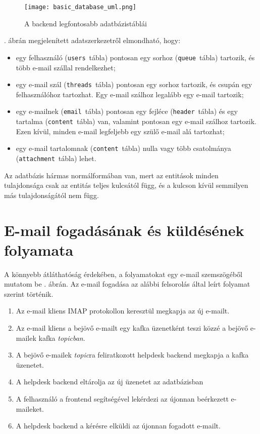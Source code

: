  \begin{figure}[hbt] 
 	\centering
 	\texttt{[image: basic\_database\_uml.png]}
 	\caption{A backend legfontosabb adatbázistáblái}
 	\label{fig:basic_database_uml}
 \end{figure}


. ábrán megjelenített adatszerkezetről elmondható, hogy:
\begin{itemize}
	\item egy felhasználó (\texttt{users}~tábla) pontosan egy sorhoz (\texttt{queue}~tábla) tartozik, és több e-mail szállal rendelkezhet;
	
	\item egy e-mail szál (\texttt{threads}~tábla) pontosan egy sorhoz tartozik, és csupán egy felhasználóhoz tartozhat. Egy e-mail szálhoz legalább egy e-mail tartozik;
	
	\item egy e-mailnek (\texttt{email}~tábla) pontosan egy fejléce (\texttt{header}~tábla) és egy tartalma (\texttt{content}~tábla) van, valamint pontosan egy  e-mail szálhoz tartozik. Ezen kívül, minden e-mail legfeljebb egy szülő e-mail alá tartozhat;

	\item egy e-mail tartalomnak (\texttt{content}~tábla) nulla vagy több csatolmánya (\texttt{attachment}~tábla) lehet.
\end{itemize}

Az adatbázis hármas normálformában van, mert az entitások minden tulajdonsága csak az entitás teljes kulcsától függ, és a kulcson kívül semmilyen más tulajdonságától nem függ.



\section{E-mail fogadásának és küldésének folyamata}
A könnyebb átláthatóság érdekében, a folyamatokat egy e-mail szemszögéből mutatom be . ábrán. Az e-mail fogadása az alábbi felsorolás által leírt folyamat szerint történik.
\begin{enumerate}
	\item Az e-mail kliens IMAP protokollon keresztül megkapja az új e-mailt.
	\item Az e-mail kliens a bejövő e-mailt egy kafka üzenetként teszi közzé a bejövő e-mailek kafka \emph{topicban}.
	\item A bejövő e-mailek \emph{topic}ra feliratkozott helpdesk backend megkapja a kafka üzenetet.
	\item A helpdesk backend eltárolja az új üzenetet az adatbázisban
	\item A felhasználó a frontend segítségével lekérdezi az újonnan beérkezett e-maileket.
	\item A helpdesk backend a kérésre elküldi az újonnan fogadott e-mailt.
\end{enumerate}

